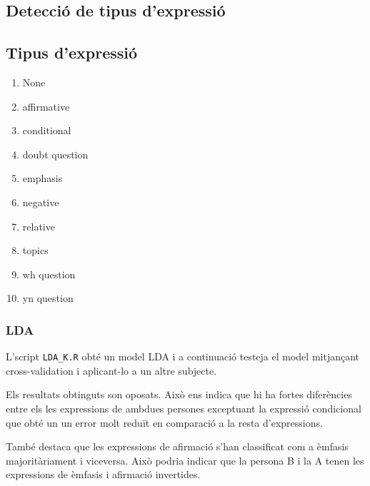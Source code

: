 \documentclass[a4paper]{article}
\begin{document}
\subsection{Detecció de tipus d'expressió}
\subsection{Tipus d'expressió}
\begin{multicols}{3}
	\begin{enumerate}
		\item None 
		\item affirmative 
		\item conditional 
		\item doubt question 
		\item emphasis 
		\item negative 
		\item relative 
		\item topics 
		\item wh question 
		\item yn question
	\end{enumerate}
\end{multicols}

\subsubsection{LDA}

L’script \verb|LDA_K.R|  obté un model LDA i a continuació testeja el model mitjançant cross-validation i aplicant-lo a un altre subjecte.

Els resultats obtinguts son oposats. Això ens indica que hi ha fortes diferències entre els les expressions de ambdues persones exceptuant la expressió condicional que obté un un error molt reduït en comparació a la resta d’expressions.

També destaca que les expressions de afirmació s’han classificat com a èmfasis majoritàriament i viceversa. Això podria indicar que la persona B i la A tenen les expressions de èmfasis i afirmació invertides.
\end{document}
